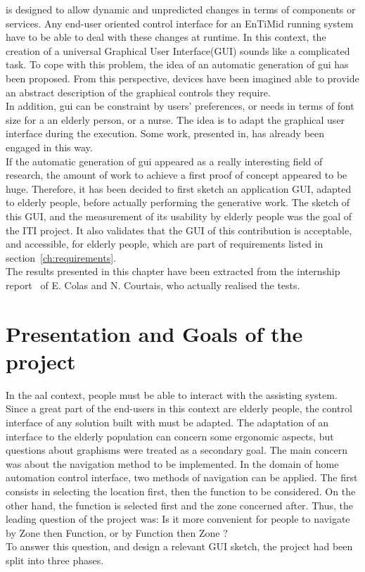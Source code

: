 \enti{} is designed to allow dynamic and unpredicted changes in terms of components or services. Any end-user oriented control interface for an EnTiMid running system have to be able to deal with these changes at runtime. In this context, the creation of a universal Graphical User Interface(GUI) sounds like a complicated task. To cope with this problem, the idea of an automatic generation of \gls{gui} has been proposed. From this perspective, devices have been imagined able to provide an abstract description of the graphical controls they require.\\
In addition, \gls{gui} can be constraint by users' preferences, or needs in terms of font size for a an elderly person, or a nurse. The idea is to adapt the graphical user interface during the execution. Some work, presented in\cite{Blouin:2011}, has already been engaged in this way.\\

If the automatic generation of \gls{gui} appeared as a really interesting field of research, the amount of work to achieve a first proof of concept appeared to be huge. Therefore, it has been decided to first sketch an application GUI, adapted to elderly people, before actually performing the generative work. The sketch of this GUI, and the measurement of its usability by elderly people was the goal of the ITI project. It also validates that the GUI of this contribution is acceptable, and accessible, for elderly people, which are part of requirements listed in section~\ref{ch:requirements}.\\

The results presented in this chapter have been extracted from the internship report~\cite{COLAS:2009} of E. Colas and N. Courtais, who actually realised the tests.

\section{Presentation and Goals of the project}

In the \gls{aal} context, people must be able to interact with the assisting system. Since a great part of the end-users in this context are elderly people, the control interface of any solution built with \enti{} must be adapted. The adaptation of an interface to the elderly population can concern some ergonomic aspects, but questions about graphisms were treated as a secondary goal. The main concern was about the navigation method to be implemented. In the domain of home automation control interface, two methods of navigation can be applied. The first consists in selecting the location first, then the function to be considered. On the other hand, the function is selected first and the zone concerned after. Thus, the leading question of the project was: Is it more convenient for people to navigate by Zone then Function, or by Function then Zone ?\\
To answer this question, and design a relevant GUI sketch, the project had been split into three phases.\\

